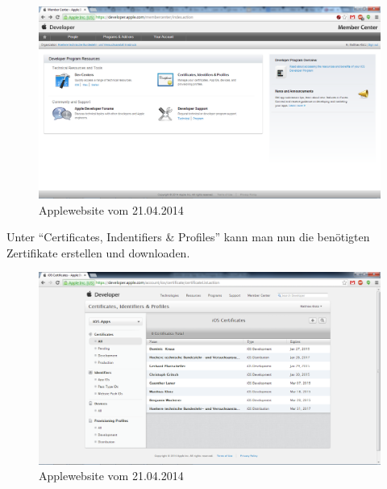 \begin{figure}[H]
\centering
\includegraphics[keepaspectratio=true, width=14cm]{images/phoneGap/AppleMemberCenter1.png}
\caption{Applewebsite vom 21.04.2014}
\end{figure}

Unter \enquote{Certificates, Indentifiers \& Profiles} kann man nun die benötigten Zertifikate erstellen und downloaden.\\

\begin{figure}[H]
\centering
\includegraphics[keepaspectratio=true, width=14cm]{images/phoneGap/AppleMemberCenter2.png}
\caption{Applewebsite vom 21.04.2014}
\end{figure}

